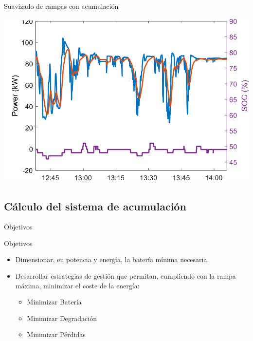 \documentclass[aspectratio=169, usenames,svgnames,dvipsnames]{beamer}
\begin{document}
\begin{frame}[label={sec:orgdadf7a4}]{Suavizado de rampas con acumulación}
\begin{center}
\includegraphics[height=0.9\textheight]{../figs/SuavizadoRampasAcumulacion.png}
\end{center}
\end{frame}

\subsection{Cálculo del sistema de acumulación}
\label{sec:orgcc981ad}

\begin{frame}[label={sec:org4c690a6}]{Objetivos}
\begin{block}{Objetivos}
\begin{itemize}
\item Dimensionar, en \alert{potencia y energía}, la batería mínima necesaria.
\item \alert{Desarrollar estrategias de gestión} que permitan, cumpliendo con la rampa máxima, minimizar el coste de la energía:
\begin{itemize}
\item Minimizar Batería
\item Minimizar Degradación
\item Minimizar Pérdidas
\end{itemize}
\end{itemize}
\end{block}
\end{frame}
\end{document}
